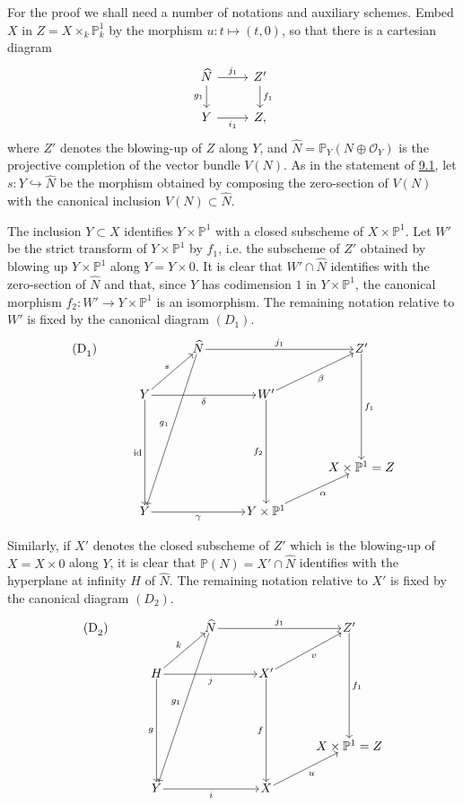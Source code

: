 \documentclass[11pt]{article}
\begin{document}
For the proof we shall need a number of notations and auxiliary schemes. Embed $X$ in $Z=X\times_k\mathbb P^1_k$ by the morphism $u:t\mapsto(t,0)$, so that there is a cartesian diagram
\[
\begin{tikzcd}
\widehat N \arrow[r,"j_1"] \arrow[d,"g_1"'] & Z' \arrow[d,"f_1"]\\
Y \arrow[r,"i_1"'] & Z ,
\end{tikzcd}
\]
where $Z'$ denotes the blowing-up of $Z$ along $Y$, and $\widehat N=\mathbb P_Y(N\oplus\mathcal O_Y)$ is the projective completion of the vector bundle $V(N)$. As in the statement of \hyperref[sga5:VII:lemma:9.1]{9.1}, let $s:Y\hookrightarrow\widehat N$ be the morphism obtained by composing the zero-section of $V(N)$ with the canonical inclusion $V(N)\subset\widehat N$.

The inclusion $Y\subset X$ identifies $Y\times\mathbb P^1$ with a closed subscheme of $X\times\mathbb P^1$. Let $W'$ be the strict transform of $Y\times\mathbb P^1$ by $f_1$, i.e. the subscheme of $Z'$ obtained by blowing up $Y\times\mathbb P^1$ along $Y=Y\times0$. It is clear that $W'\cap\widehat N$ identifies with the zero-section of $\widehat N$ and that, since $Y$ has codimension $1$ in $Y\times\mathbb P^1$, the canonical morphism $f_2:W'\to Y\times\mathbb P^1$ is an isomorphism. The remaining notation relative to $W'$ is fixed by the canonical diagram $(D_1)$.
\[
\begin{tikzcd}[column sep=3.2em,row sep=2.4em,cells={nodes={inner sep=1pt}}]
\text{(D}_1\text{)}\arrow[from=1-3,to=5-2,"g_1"']
& & \widehat N \arrow[rr,"j_1"] & & Z' \arrow[ddd,"f_1"] \\
& Y \arrow[ur,"s"] \arrow[rr,"\delta"'] \arrow[ddd,"\mathrm{id}"'] & &
W' \arrow[ur,"\beta"'] \arrow[ddd,"f_2"'] & \\
& & & & \\
& & & & X\times\mathbb P^1=Z \\
& Y \arrow[rr,"\gamma"'] & & Y\times\mathbb P^1 \arrow[ur,"\alpha"'] &
\end{tikzcd}
\]

Similarly, if $X'$ denotes the closed subscheme of $Z'$ which is the blowing-up of $X=X\times0$ along $Y$, it is clear that $\mathbb P(N)=X'\cap\widehat N$ identifies with the hyperplane at infinity $H$ of $\widehat N$. The remaining notation relative to $X'$ is fixed by the canonical diagram $(D_2)$.
\[
\begin{tikzcd}[column sep=3.2em,row sep=2.4em,cells={nodes={inner sep=1pt}}]
\text{(D}_2\text{)}\arrow[from=1-3,to=5-2,"g_1"']
& & \widehat N \arrow[rr,"j_1"] & & Z' \arrow[ddd,"f_1"] \\
& H \arrow[ur,"k"] \arrow[rr,"j"'] \arrow[ddd,"g"'] & &
X' \arrow[ur,"v"'] \arrow[ddd,"f"'] & \\
& & & & \\
& & & & X\times\mathbb P^1=Z \\
& Y \arrow[rr,"i"'] & & X \arrow[ur,"u"'] &
\end{tikzcd}
\]
\end{document}
